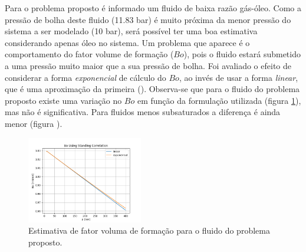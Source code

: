 \documentclass[final,3p]{elsarticle}
\numberwithin{equation}{section}
\begin{document}
          Para o problema proposto é informado um fluido de baixa razão gás-óleo. Como a pressão de bolha deste fluido (11.83 bar) é muito próxima da menor pressão do sistema a ser modelado (10 bar), será possível ter uma boa estimativa considerando apenas óleo no sistema. Um problema que aparece é o comportamento do fator volume de formação ($Bo$), pois o fluido estará submetido a uma pressão muito maior que a sua pressão de bolha. Foi avaliado o efeito de considerar a forma \emph{exponencial} de cálculo do $Bo$, ao invés de usar a forma \emph{linear}, que é uma aproximação da primeira (). Observa-se que para o fluido do problema proposto existe uma variação no $Bo$ em função da formulação utilizada (figura \ref{fig:bo_problema_proposto}), mas não é significativa. Para fluidos menos subsaturados a diferença é ainda menor (figura ).

          \begin{figure}
            \centering
            \includegraphics[width=0.45\textwidth]{pvt/bo2.png}
            \caption{Estimativa de fator voluma de formação para o fluido do problema proposto.}
            \label{fig:bo_problema_proposto}
        \end{figure}



\end{document}
